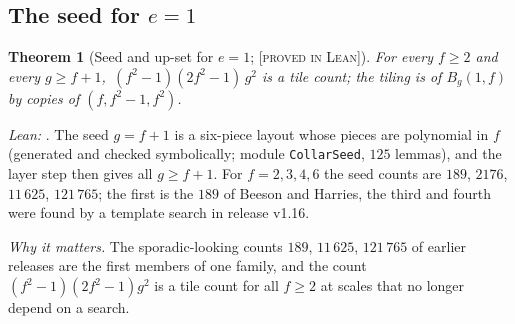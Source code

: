 \documentclass[11pt,reqno]{amsart}
\theoremstyle{plain}
\newtheorem{theorem}{Theorem}[section]
\theoremstyle{definition}
\newcommand{\lab}[1]{\textup{[\textsc{#1}]}}
\newcommand{\PL}{\lab{proved in Lean}}
\newcommand{\why}[1]{\par\smallskip\noindent\emph{Why it matters.} #1\par}
\begin{document}
\subsection{The seed for $e=1$}
\begin{theorem}[Seed and up-set for $e=1$; \PL{}]\label{thm:seedA}
For every $f\ge2$ and every $g\ge f+1$, $\,(f^2-1)(2f^2-1)\,g^2$ is a tile count; the tiling is of $B_g(1,f)$ by copies of $(f,f^2-1,f^2)$.
\end{theorem}
\emph{Lean:} . The seed $g=f+1$ is a six-piece layout whose pieces are polynomial in $f$ (generated and checked symbolically; module \texttt{CollarSeed}, $125$ lemmas), and the layer step then gives all $g\ge f+1$.
For $f=2,3,4,6$ the seed counts are $189$, $2176$, $11\,625$, $121\,765$; the first is the $189$ of Beeson and Harries, the third and fourth were found by a template search in release v1.16.
\why{The sporadic-looking counts $189$, $11\,625$, $121\,765$ of earlier releases are the first members of one family, and the count $(f^2-1)(2f^2-1)g^2$ is a tile count for all $f\ge2$ at scales that no longer depend on a search.}
\end{document}
